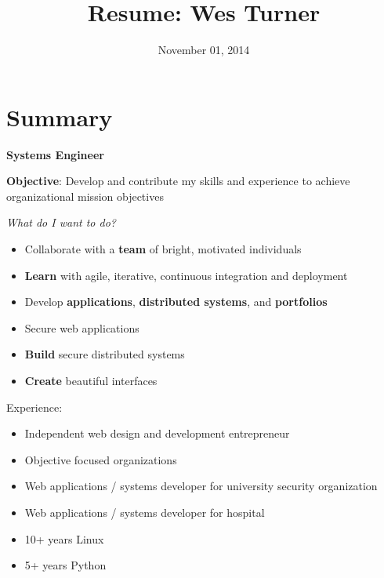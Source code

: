 \documentclass[letter,,openany,oneside]{sphinxhowto}
\title{Resume: Wes Turner}
\date{November 01, 2014}
\author{}
\begin{document}
\maketitle
\tableofcontents
{}\label{resume::doc}

\newpage

\section{Summary}
\label{resume:summary}\label{resume:id1}
\textbf{Systems Engineer}

\textbf{Objective}: Develop and contribute my skills and experience to
achieve organizational mission objectives

\emph{What do I want to do?}
\begin{itemize}
\item {} 
Collaborate with a \textbf{team} of bright, motivated individuals

\item {} 
\textbf{Learn} with agile, iterative, continuous integration and deployment

\item {} 
Develop \textbf{applications}, \textbf{distributed systems}, and \textbf{portfolios}

\item {} 
Secure web applications

\item {} 
\textbf{Build} secure distributed systems

\item {} 
\textbf{Create} beautiful interfaces

\end{itemize}

Experience:
\begin{itemize}
\item {} 
Independent web design and development entrepreneur

\item {} 
Objective focused organizations

\item {} 
Web applications / systems developer for university security organization

\item {} 
Web applications / systems developer for hospital

\item {} 
10+ years Linux

\item {} 
5+ years Python

\end{itemize}
\end{document}
